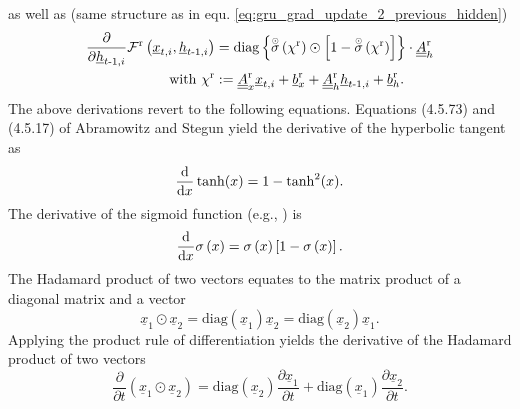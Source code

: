 as well as (same structure as in equ. \ref{eq:gru_grad_update_2_previous_hidden})
\begin{align}
    \frac{\partial}{\partial \underline h_{t\text{-}1, i}}
    \mathcal{F}^\text{r} \left(\underline x_{t, i}, \underline h_{t\text{-}1, i}\right)
    &=
    \mathrm{diag} \left\{
        \overset{\scriptscriptstyle \odot}{\sigma} \left(\chi^\text{r}\right)
        \odot
        \left[
            1 -  \overset{\scriptscriptstyle \odot}{\sigma} \left(\chi^\text{r}\right)
        \right]
    \right\}
    \cdot \underline{\underline A}^\text{r}_{h}
    \nonumber \\
    \text{with } \chi^\text{r} & :=
    \underline{\underline A}^\text{r}_{x}
            \underline x_{t,i}
            +
            \underline b^\text{r}_{x}
            +
            \underline{\underline A}^\text{r}_{h}
            \underline h_{t\text -1,i}
            +
            \underline b^\text{r}_{h}.
\end{align}
The above derivations revert to the following equations.
Equations (4.5.73) and (4.5.17) of Abramowitz and Stegun \cite{D.1966}
yield the derivative of the hyperbolic tangent as
\begin{equation} \label{eq:derivative_tanh}
    \frac{\text d}{\text d x} \tanh (x) = 1 - \tanh^2 (x).
\end{equation}
The derivative of the sigmoid function (e.g., \cite{Minai1993}) is
\begin{equation} \label{eq:derivative_sigmoid}
    \frac{\text d}{\text d x} \sigma \left(x\right) 
    = 
    \sigma \left(x\right) 
    \left[
        1 - \sigma \left(x\right)
    \right].
\end{equation}
The Hadamard product of two vectors \cite{Brookes2020} equates to the 
matrix product of a diagonal matrix and a vector 
\begin{equation} \label{eq:hadamard_product_two_vectors}
    \underline x_1 \odot \underline x_2 
= 
    \mathrm{diag} \left(\underline x_1\right) \underline x_2 
=   
    \mathrm{diag} \left(\underline x_2\right) \underline x_1.
\end{equation}
Applying the product rule of differentiation 
yields the derivative of the Hadamard product of two vectors
\begin{equation} \label{eq:differentiation_hadamard_product_two_vectors}
    \frac{\partial}{\partial t} \left(
        \underline x_1 \odot \underline x_2 
    \right)
    =   
    \mathrm{diag} \left(\underline x_2\right)
    \frac{\partial \underline x_1}{\partial t} 
    +
    \mathrm{diag} \left(\underline x_1\right)
    \frac{\partial \underline x_2}{\partial t}.
\end{equation}
